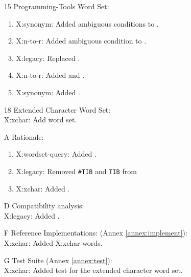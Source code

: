 \begin{itemize}
	\item[15] Programming-Tools Word Set:
		\begin{enumerate}
		\item \textsf{X:synonym}: Added ambiguous conditions to .
		\item \textsf{X:n-to-r}: Added ambiguous condition to .
		\item \textsf{X:legacy}: Replaced .
		\item \textsf{X:n-to-r}: Added  and .
		\item \textsf{X:synonym}: Added .
		\end{enumerate}

	\item[18] Extended Character Word Set: \\
		\textsf{X:xchar}: Add word set.

	\item[A] Rationale:								%
		\begin{enumerate}
		\item \textsf{X:wordset-query}: Added .
		\item \textsf{X:legacy}: Removed \texttt{\#TIB} and \texttt{TIB} from
		\item \textsf{X:xchar}: Added .
		\end{enumerate}

	\item[D] Compatibility analysis: \\			%
		\textsf{X:legacy}: Added .

	\item[F] Reference Implementations: (Annex \ref{annex:implement}): \\
		\textsf{X:xchar}: Added \textsf{X:xchar} words.

	\item[G] Test Suite (Annex \ref{annex:test}): \\
		\textsf{X:xchar}: Added test for the extended character word set.
	\end{itemize}


